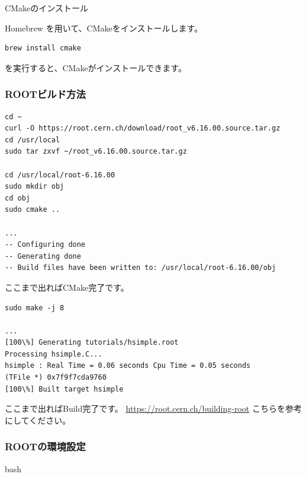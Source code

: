 \documentclass[10pt]{ujarticle}
\begin{document}
\vspace{0.5cm}
CMakeのインストール
\vspace{0.3cm}

Homebrew を用いて、CMakeをインストールします。
\begin{lstlisting}
brew install cmake
\end{lstlisting}
を実行すると、CMakeがインストールできます。

\subsubsection{ROOTビルド方法}

\begin{lstlisting}
cd ~
curl -O https://root.cern.ch/download/root_v6.16.00.source.tar.gz
cd /usr/local
sudo tar zxvf ~/root_v6.16.00.source.tar.gz

cd /usr/local/root-6.16.00
sudo mkdir obj
cd obj
sudo cmake ..

...
-- Configuring done
-- Generating done
-- Build files have been written to: /usr/local/root-6.16.00/obj 
\end{lstlisting}
ここまで出ればCMake完了です。
\begin{lstlisting}
sudo make -j 8

...
[100\%] Generating tutorials/hsimple.root
Processing hsimple.C...
hsimple : Real Time = 0.06 seconds Cpu Time = 0.05 seconds
(TFile *) 0x7f9f7cda9760
[100\%] Built target hsimple 
\end{lstlisting}
ここまで出ればBuild完了です。
\url{https://root.cern.ch/building-root}
こちらを参考にしてください。

\subsubsection{ROOTの環境設定}

bash
\end{document}
